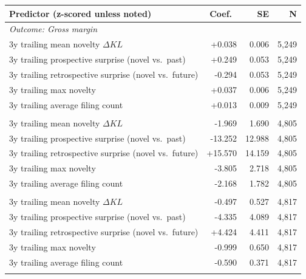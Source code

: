 \begin{tabular}{lrrr}
\toprule
Predictor (z-scored unless noted) & Coef.\ & SE & N \\
\midrule
\multicolumn{4}{l}{\textit{Outcome: Gross margin}} \\
\midrule
3y trailing mean novelty $\Delta KL$ & +0.038 & 0.006 & 5,249 \\
\addlinespace[1pt]
3y trailing prospective surprise (novel vs.\ past) & +0.249 & 0.053 & 5,249 \\
3y trailing retrospective surprise (novel vs.\ future) & -0.294 & 0.053 & 5,249 \\
\addlinespace[1pt]
3y trailing max novelty & +0.037 & 0.006 & 5,249 \\
3y trailing average filing count & +0.013 & 0.009 & 5,249 \\
\addlinespace[1pt]
\midrule
\multicolumn{4}{l}{\textit{Outcome: Net margin}} \\
\midrule
3y trailing mean novelty $\Delta KL$ & -1.969 & 1.690 & 4,805 \\
\addlinespace[1pt]
3y trailing prospective surprise (novel vs.\ past) & -13.252 & 12.988 & 4,805 \\
3y trailing retrospective surprise (novel vs.\ future) & +15.570 & 14.159 & 4,805 \\
\addlinespace[1pt]
3y trailing max novelty & -3.805 & 2.718 & 4,805 \\
3y trailing average filing count & -2.168 & 1.782 & 4,805 \\
\addlinespace[1pt]
\midrule
\multicolumn{4}{l}{\textit{Outcome: Operating margin}} \\
\midrule
3y trailing mean novelty $\Delta KL$ & -0.497 & 0.527 & 4,817 \\
\addlinespace[1pt]
3y trailing prospective surprise (novel vs.\ past) & -4.335 & 4.089 & 4,817 \\
3y trailing retrospective surprise (novel vs.\ future) & +4.424 & 4.411 & 4,817 \\
\addlinespace[1pt]
3y trailing max novelty & -0.999 & 0.650 & 4,817 \\
3y trailing average filing count & -0.590 & 0.371 & 4,817 \\
\addlinespace[1pt]
\bottomrule
\end{tabular}
